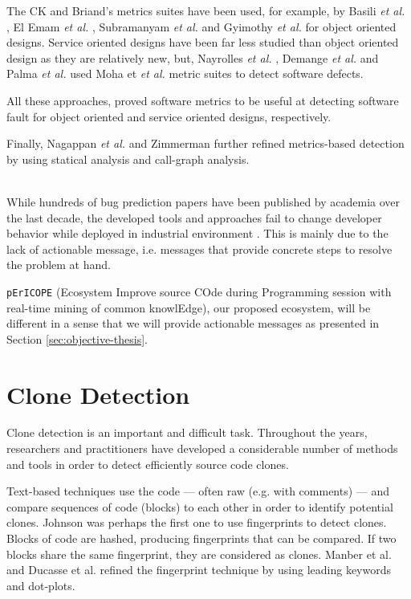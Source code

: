 The CK and Briand's metrics suites have been used, for example, by Basili \textit{et al.} \cite{Basili1996}, El Emam \textit{et al.} \cite{ElEmam2001},  Subramanyam \textit{et al.} \cite{Subramanyam2003} and Gyimothy \textit{et al.} \cite{Gyimothy2005} for object oriented designs.
Service oriented designs have been far less studied than object oriented design as they are relatively new, but, Nayrolles \textit{et al.} \cite{Nayrolles,Nayrolles2013d}, Demange \textit{et al.} \cite{demange2013} and Palma \textit{et al.} \cite{Palma2013} used Moha et \textit{et al.} metric suites to detect software defects.

All these approaches, proved software metrics to be useful at detecting software fault for object oriented and service oriented designs, respectively.

Finally, Nagappan \textit{et al.} \cite{Nagappan2005,Nagappan2006} and Zimmerman \cite{Zimmermann2007,Zimmermann2008} further refined metrics-based detection by using statical analysis and call-graph analysis.

\\
While hundreds of bug prediction papers have been published by academia over the last decade, the developed tools and approaches fail to change developer behavior while deployed in industrial environment \cite{Lewis2013}.
This is mainly due to the lack of actionable message, i.e. messages that provide concrete steps to resolve the problem at hand.

{\tt pErICOPE} (Ecosystem Improve source COde during Programming session with real-time mining of common knowlEdge), our proposed ecosystem, will be different in a sense that we will provide actionable messages as presented in Section \ref{sec:objective-thesis}.


\section{Clone Detection}
\label{sec:rel-clones}

Clone detection is an important and difficult task. Throughout the years, researchers and practitioners have developed a considerable number of methods and tools in order to detect efficiently source code clones.

Text-based techniques use the code --- often raw (e.g. with comments) --- and compare sequences of code (blocks) to each other in order to identify potential clones. Johnson was perhaps the first one to use fingerprints to detect clones\cite{Johnson1993,Johnson1994}. Blocks of code are hashed, producing fingerprints that can be compared.
If two blocks share the same fingerprint, they are considered as clones.
Manber et al. \cite{Manber1994} and Ducasse et al.\cite{Ducasse1999} refined the fingerprint technique by using leading keywords and dot-plots.

